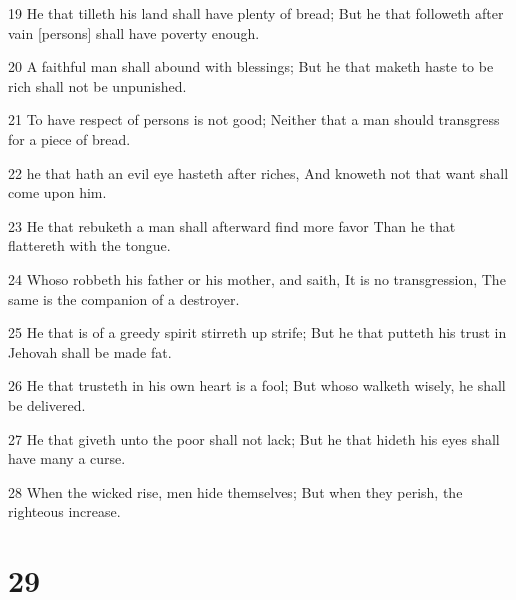 \par 19 He that tilleth his land shall have plenty of bread; But he that followeth after vain [persons] shall have poverty enough.
\par 20 A faithful man shall abound with blessings; But he that maketh haste to be rich shall not be unpunished.
\par 21 To have respect of persons is not good; Neither that a man should transgress for a piece of bread.
\par 22 he that hath an evil eye hasteth after riches, And knoweth not that want shall come upon him.
\par 23 He that rebuketh a man shall afterward find more favor Than he that flattereth with the tongue.
\par 24 Whoso robbeth his father or his mother, and saith, It is no transgression, The same is the companion of a destroyer.
\par 25 He that is of a greedy spirit stirreth up strife; But he that putteth his trust in Jehovah shall be made fat.
\par 26 He that trusteth in his own heart is a fool; But whoso walketh wisely, he shall be delivered.
\par 27 He that giveth unto the poor shall not lack; But he that hideth his eyes shall have many a curse.
\par 28 When the wicked rise, men hide themselves; But when they perish, the righteous increase.

\chapter{29}

